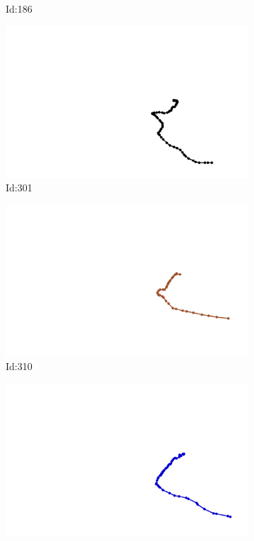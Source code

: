 \documentclass[12pt,twoside]{report}
\begin{document}
\begin{figure}
\begin{subfigure}[b]{0.20\textwidth}
\caption{Id:186}
\end{subfigure}
\begin{subfigure}[b]{0.20\textwidth}
\centering
\includegraphics[width=\textwidth]{../../trajectories/301.png}
\caption{Id:301}
\end{subfigure}
\begin{subfigure}[b]{0.20\textwidth}
\centering
\includegraphics[width=\textwidth]{../../trajectories/310.png}
\caption{Id:310}
\end{subfigure}
\begin{subfigure}[b]{0.20\textwidth}
\centering
\includegraphics[width=\textwidth]{../../trajectories/466.png}

\end{subfigure}
\end{figure}
\end{document}

